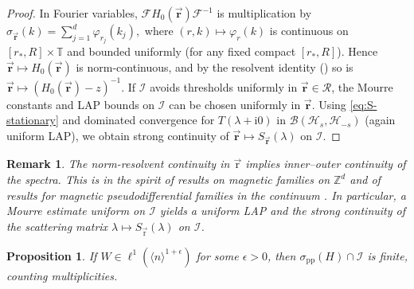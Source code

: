 \documentclass[10pt]{amsart} %
\newcommand{\1}{{\mathbb{I}}}
\numberwithin{equation}{section}
\newtheorem{proposition}[theorem]{Proposition}%
\newtheorem{remark}[theorem]{Remark}%
\begin{document}
\begin{proof}
In Fourier variables,
\(
\mathcal{F} H_0(\vec{\mathbf{r}})\mathcal{F}^{-1}
\)
is multiplication by
\(
\sigma_{\vec{\mathbf{r}}}(k)=\sum_{j=1}^d \varphi_{r_j}(k_j),
\)
where $(r,k)\mapsto\varphi_r(k)$ is continuous on $[r_*,R]\times\mathbb{T}$ and bounded uniformly
(for any fixed compact $[r_*,R]$). Hence $\vec{\mathbf{r}}\mapsto H_0(\vec{\mathbf{r}})$ is norm-continuous,
and by the resolvent identity (\cite[Thm.~IV.1.16]{Kato80}) so is
\(
\vec{\mathbf{r}}\mapsto (H_0(\vec{\mathbf{r}})-z)^{-1}.
\)
If $\mathcal{I}$ avoids thresholds uniformly in $\vec{\mathbf{r}}\in\mathcal{R}$, the Mourre constants and
LAP bounds on $\mathcal{I}$ can be chosen uniformly in $\vec{\mathbf{r}}$. Using \eqref{eq:S-stationary}
and dominated convergence for $T(\lambda+\mathrm{i}0)$ in $\mathcal{B}(\mathcal{H}_s,\mathcal{H}_{-s})$
(again uniform LAP), we obtain strong continuity of $\vec{\mathbf{r}}\mapsto S_{\vec{\mathbf{r}}}(\lambda)$ on $\mathcal{I}$.
\end{proof}
\begin{remark}
The norm-resolvent continuity in $\vec{\mathrm{r}}$ implies inner--outer continuity of the spectra.
This is in the spirit of results on magnetic families on $\mathbb{Z}^d$ \cite{ParraRichard-Zd}
and of results for magnetic pseudodifferential families in the continuum \cite{AthmouniMantoiuPurice-2010}.
In particular, a Mourre estimate uniform on $\mathcal I$ yields a uniform LAP and the strong continuity of
the scattering matrix $\lambda\mapsto S_{\vec{\mathrm{r}}}(\lambda)$ on $\mathcal I$.
\end{remark}
\begin{proposition}\label{prop:finite-pp}
If $W\in \ell^{1}(\langle n\rangle^{1+\epsilon})$ for some $\epsilon>0$, then
$\sigma_{\mathrm{pp}}(H)\cap \mathcal{I}$ is finite, counting multiplicities.
\end{proposition}
\end{document}
